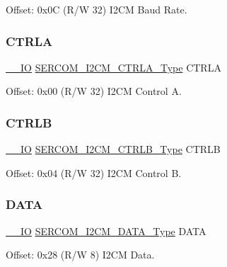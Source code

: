Offset\+: 0x0C (R/W 32) I2\+CM Baud Rate. 

\mbox{\label{struct_sercom_i2cm_a30df6c5167df08b0beb3e7bcea9d1dec}} 
\subsubsection{\texorpdfstring{CTRLA}{CTRLA}}
{\footnotesize\ttfamily \mbox{\hyperlink{core__cm0plus_8h_aec43007d9998a0a0e01faede4133d6be}{\+\_\+\+\_\+\+IO}} \mbox{\hyperlink{union_s_e_r_c_o_m___i2_c_m___c_t_r_l_a___type}{S\+E\+R\+C\+O\+M\+\_\+\+I2\+C\+M\+\_\+\+C\+T\+R\+L\+A\+\_\+\+Type}} C\+T\+R\+LA}



Offset\+: 0x00 (R/W 32) I2\+CM Control A. 

\mbox{\label{struct_sercom_i2cm_ad5daf679946a0bd5712f70b4af7e73ad}} 
\subsubsection{\texorpdfstring{CTRLB}{CTRLB}}
{\footnotesize\ttfamily \mbox{\hyperlink{core__cm0plus_8h_aec43007d9998a0a0e01faede4133d6be}{\+\_\+\+\_\+\+IO}} \mbox{\hyperlink{union_s_e_r_c_o_m___i2_c_m___c_t_r_l_b___type}{S\+E\+R\+C\+O\+M\+\_\+\+I2\+C\+M\+\_\+\+C\+T\+R\+L\+B\+\_\+\+Type}} C\+T\+R\+LB}



Offset\+: 0x04 (R/W 32) I2\+CM Control B. 

\mbox{\label{struct_sercom_i2cm_a7d4817db0c66be19ba047d40e1c7f4e5}} 
\subsubsection{\texorpdfstring{DATA}{DATA}}
{\footnotesize\ttfamily \mbox{\hyperlink{core__cm0plus_8h_aec43007d9998a0a0e01faede4133d6be}{\+\_\+\+\_\+\+IO}} \mbox{\hyperlink{union_s_e_r_c_o_m___i2_c_m___d_a_t_a___type}{S\+E\+R\+C\+O\+M\+\_\+\+I2\+C\+M\+\_\+\+D\+A\+T\+A\+\_\+\+Type}} D\+A\+TA}



Offset\+: 0x28 (R/W 8) I2\+CM Data. 

